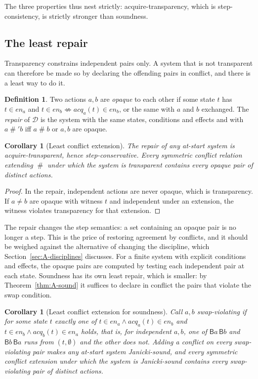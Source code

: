 \documentclass[preprint,12pt]{elsarticle}
\theoremstyle{plain}
\newtheorem{corollary}[theorem]{Corollary}
\theoremstyle{definition}
\newtheorem{definition}[theorem]{Definition}
\newcommand{\en}{\mathit{en}}
\newcommand{\acq}{\mathit{acq}}
\newcommand{\conf}{\mathrel{\#}}
\newcommand{\B}[1]{\mathsf{B}#1}
\newcommand{\D}{\mathcal{D}}
\begin{document}
The three properties thus nest strictly: acquire-transparency, which is step-consistency, is strictly stronger than soundness.

\subsection{The least repair}

Transparency constrains independent pairs only. A system that is not transparent can therefore be made so by declaring the offending pairs in conflict, and there is a least way to do it.

\begin{definition}
Two actions $a, b$ are \emph{opaque} to each other if some state $t$ has $t \in \en_a$ and $t \in \en_b \not\Leftrightarrow \acq_a(t) \in \en_b$, or the same with $a$ and $b$ exchanged. The \emph{repair} of $\D$ is the system with the same states, conditions and effects and with $a \conf' b$ iff $a \conf b$ or $a, b$ are opaque.
\end{definition}

\begin{corollary}[Least conflict extension]
\label{cor:A-repair}
The repair of any at-start system is acquire-transparent, hence step-conservative. Every symmetric conflict relation extending $\conf$ under which the system is transparent contains every opaque pair of distinct actions.
\end{corollary}

\begin{proof}
In the repair, independent actions are never opaque, which is transparency. If $a \neq b$ are opaque with witness $t$ and independent under an extension, the witness violates transparency for that extension.
\end{proof}

The repair changes the step semantics: a set containing an opaque pair is no longer a step. This is the price of restoring agreement by conflicts, and it should be weighed against the alternative of changing the discipline, which Section~\ref{sec:A-disciplines} discusses. For a finite system with explicit conditions and effects, the opaque pairs are computed by testing each independent pair at each state. Soundness has its own least repair, which is smaller: by Theorem~\ref{thm:A-sound} it suffices to declare in conflict the pairs that violate the swap condition.

\begin{corollary}[Least conflict extension for soundness]
\label{cor:A-swaprepair}
Call $a, b$ \emph{swap-violating} if for some state $t$ exactly one of $t \in \en_a \wedge \acq_a(t) \in \en_b$ and $t \in \en_b \wedge \acq_b(t) \in \en_a$ holds, that is, for independent $a, b$, one of $\B{a}\,\B{b}$ and $\B{b}\,\B{a}$ runs from $(t, \emptyset)$ and the other does not. Adding a conflict on every swap-violating pair makes any at-start system Janicki-sound, and every symmetric conflict extension under which the system is Janicki-sound contains every swap-violating pair of distinct actions.
\end{corollary}
\end{document}
